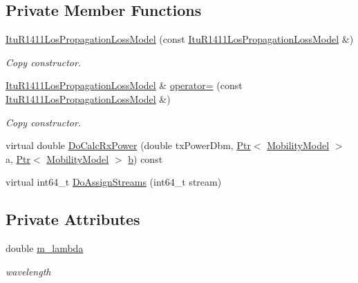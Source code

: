 \subsection*{Private Member Functions}
\begin{DoxyCompactItemize}
\item 
\hyperlink{classns3_1_1ItuR1411LosPropagationLossModel_a9bb5356302975a38ad9141ec052b9d1e}{Itu\+R1411\+Los\+Propagation\+Loss\+Model} (const \hyperlink{classns3_1_1ItuR1411LosPropagationLossModel}{Itu\+R1411\+Los\+Propagation\+Loss\+Model} \&)
\begin{DoxyCompactList}\small\item\em Copy constructor. \end{DoxyCompactList}\item 
\hyperlink{classns3_1_1ItuR1411LosPropagationLossModel}{Itu\+R1411\+Los\+Propagation\+Loss\+Model} \& \hyperlink{classns3_1_1ItuR1411LosPropagationLossModel_a66d1cd38ba21725c5678ba10d309a2c3}{operator=} (const \hyperlink{classns3_1_1ItuR1411LosPropagationLossModel}{Itu\+R1411\+Los\+Propagation\+Loss\+Model} \&)
\begin{DoxyCompactList}\small\item\em Copy constructor. \end{DoxyCompactList}\item 
virtual double \hyperlink{classns3_1_1ItuR1411LosPropagationLossModel_a4d3a669fac3015e30ab70d53113d7d52}{Do\+Calc\+Rx\+Power} (double tx\+Power\+Dbm, \hyperlink{classns3_1_1Ptr}{Ptr}$<$ \hyperlink{classns3_1_1MobilityModel}{Mobility\+Model} $>$ a, \hyperlink{classns3_1_1Ptr}{Ptr}$<$ \hyperlink{classns3_1_1MobilityModel}{Mobility\+Model} $>$ \hyperlink{lte__pathloss_8m_a21ad0bd836b90d08f4cf640b4c298e7c}{b}) const 
\item 
virtual int64\+\_\+t \hyperlink{classns3_1_1ItuR1411LosPropagationLossModel_ae5bbcfa815ecbcb832e3dd6f6ec4bc91}{Do\+Assign\+Streams} (int64\+\_\+t stream)
\end{DoxyCompactItemize}
\subsection*{Private Attributes}
\begin{DoxyCompactItemize}
\item 
double \hyperlink{classns3_1_1ItuR1411LosPropagationLossModel_a86fc083a1850204ea9dfbde06c226c5e}{m\+\_\+lambda}
\begin{DoxyCompactList}\small\item\em wavelength \end{DoxyCompactList}\end{DoxyCompactItemize}

